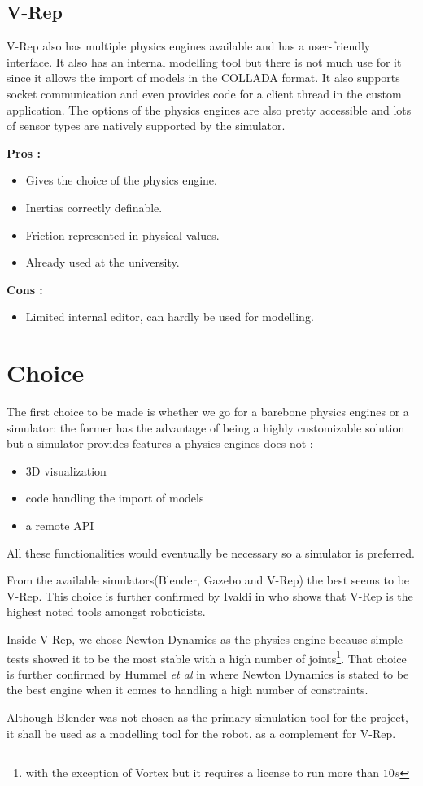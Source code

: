 \subsection{V-Rep}
V-Rep also has multiple physics engines available and has a user-friendly interface. It also has an internal modelling tool but there is not much use for it since it allows the import of models in the COLLADA format. It also supports socket communication and even provides code for a client thread in the custom application. The options of the physics engines are also pretty accessible and lots of sensor types are natively supported by the simulator.

\textbf{Pros :}
\begin{itemize}
\item Gives the choice of the physics engine.
\item Inertias correctly definable.
\item Friction represented in physical values.
\item Already used at the university.
\end{itemize}

\textbf{Cons :}
\begin{itemize}
\item Limited internal editor, can hardly be used for modelling.
\end{itemize}

\section{Choice}
The first choice to be made is whether we go for a barebone physics engines or a simulator: the former has the advantage of being a highly customizable solution but a simulator provides features a physics engines does not :\begin{itemize}
\item 3D visualization
\item code handling the import of models
\item a remote API
\end{itemize}
All these functionalities would eventually be necessary so a simulator is preferred. 

From the available simulators(Blender, Gazebo and V-Rep) the best seems to be V-Rep. This choice is further confirmed by Ivaldi in \cite{ivaldi2014tools} who shows that V-Rep is the highest noted tools amongst roboticists.

Inside V-Rep, we chose Newton Dynamics as the physics engine because simple tests showed it to be the most stable with a high number of joints\footnote{with the exception of Vortex but it requires a license to run more than $10s$}. That choice is further confirmed by Hummel \textit{et al} in \cite{hummel2012evaluation} where Newton Dynamics is stated to be the best engine when it comes to handling a high number of constraints.

Although Blender was not chosen as the primary simulation tool for the project, it shall be used as a modelling tool for the robot, as a complement for V-Rep.
